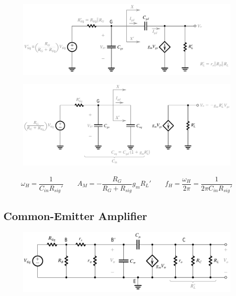 \begin{figure}[H]
  \centering
  \includegraphics[width=0.9\linewidth]{figures/Frequency-Response-CS-High-2}
  \label{fig:}
\end{figure}

\begin{figure}[H]
  \centering
  \includegraphics[width=\linewidth]{figures/Frequency-Response-CS-High-3}
  \label{fig:}
\end{figure}

\begin{equation*}
  \begin{aligned}
    \omega_H = \dfrac{1}{C_{in} R_{sig}'} \quad\quad A_M = - \dfrac{R_G}{R_G + R_{sig}} g_m R_L' \quad\quad f_H = \dfrac{\omega_H}{2 \pi} = \dfrac{1}{2 \pi C_{in} R_{sig}'}   
  \end{aligned}
\end{equation*}

\subsection{Common-Emitter Amplifier}

\begin{figure}[H]
  \centering
  \includegraphics[width=0.9\linewidth]{figures/Frequency-Response-CE-High-1}
  \label{fig:}
\end{figure}

